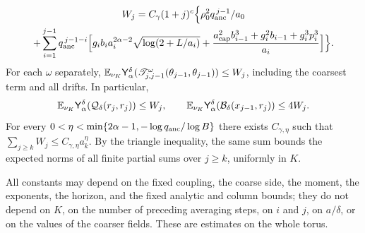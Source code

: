 \begin{theorem}
\begin{enumerate}
\begin{multline*}
 W_j=C_\gamma(1+j)^c\Bigl\{\rho_0^2q_{\mathrm{anc}}^{\,j-1}/a_0\\
 +\sum_{i=1}^{j-1}q_{\mathrm{anc}}^{\,j-1-i}\Bigl[g_ib_ia_i^{2\alpha-2}\sqrt{\log(2+L/a_i)}+\frac{a_{\mathrm{cap}}^2b_{i-1}^3+g_i^2b_{i-1}+g_i^3p_i^3}{a_i}\Bigr]\Bigr\}.
\end{multline*}
For each $\omega$ separately, $\mathbb E_{\nu_K}\mathsf Y_{\alpha}^{\delta}(\mathscr T_{j,j-1}^\omega(\theta_{j-1},\theta_{j-1}))\le W_j$, including the coarsest term and all drifts. In particular,
\[
 \mathbb E_{\nu_K}\mathsf Y_{\alpha}^{\delta}(\mathcal Q_\delta(r_j,r_j))\le W_j,\qquad
 \mathbb E_{\nu_K}\mathsf Y_{\alpha}^{\delta}(\mathcal B_\delta(x_{j-1},r_j))\le4W_j.
\]
For every $0<\eta<\min\{2\alpha-1,-\log q_{\mathrm{anc}}/\log B\}$ there exists $C_{\gamma,\eta}$ such that $\sum_{j\ge k}W_j\le C_{\gamma,\eta}a_k^\eta$. By the triangle inequality, the same sum bounds the expected norms of all finite partial sums over $j\ge k$, uniformly in $K$.
\end{enumerate}
All constants may depend on the fixed coupling, the coarse side, the moment, the exponents, the horizon, and the fixed analytic and column bounds; they do not depend on $K$, on the number of preceding averaging steps, on $i$ and $j$, on $a/\delta$, or on the values of the coarser fields. These are estimates on the whole torus.
\end{theorem}

